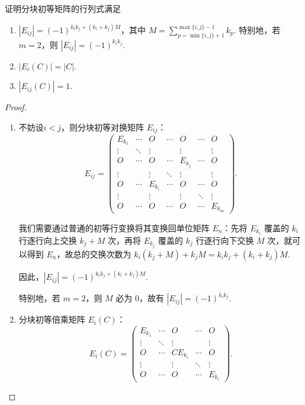\begin{example}{}{}
    证明分块初等矩阵的行列式满足

    \begin{enumerate}
        \item $|E_{ij}| = (-1)^{k_i k_j + (k_i + k_j) M}$，其中 $M=\displaystyle\sum_{p=\min\{i,j\} + 1}^{\max\{i,j\} - 1} k_p$. 特别地，若 $m=2$，则 $|E_{ij}| = (-1)^{k_i k_j}$.
        \item $|E_i(C)| = |C|$.
        \item $|E_{ij}(C)| = 1$.
    \end{enumerate}
\end{example}

\begin{proof}
    \begin{enumerate}
        \item 不妨设$i<j$，则分块初等对换矩阵 $E_{ij}$：
            \[
                E_{ij} = \begin{pmatrix}
                    E_{k_1} & \cdots & O       & \cdots & O       & \cdots & O       \\
                    \vdots  & \ddots & \vdots  &        & \vdots  &        & \vdots  \\
                    O       & \cdots & O       & \cdots & E_{k_j} & \cdots & O       \\
                    \vdots  &        & \vdots  & \ddots & \vdots  &        & \vdots  \\
                    O       & \cdots & E_{k_i} & \cdots & O       & \cdots & O       \\
                    \vdots  &        & \vdots  &        & \vdots  & \ddots & \vdots  \\
                    O       & \cdots & O       & \cdots & O       & \cdots & E_{k_m}
                \end{pmatrix}.
            \]

            我们需要通过普通的初等行变换将其变换回单位矩阵 $E_n$：先将 $E_{k_i}$ 覆盖的 $k_i$ 行逐行向上交换 $k_j + M$ 次，再将 $E_{k_j}$ 覆盖的 $k_j$ 行逐行向下交换 $M$ 次，就可以得到 $E_n$，故总的交换次数为 $k_i(k_j+M) + k_j M = k_i k_j + (k_i + k_j) M$.

            因此，$|E_{ij}| = (-1)^{k_i k_j + (k_i + k_j) M}$.

            特别地，若 $m=2$，则 $M$ 必为 $0$，故有 $|E_{ij}| = (-1)^{k_i k_j}$.

        \item 分块初等倍乘矩阵 $E_i(C)$：
            \[
                E_i(C) = \begin{pmatrix}
                    E_{k_1} & \cdots & O        & \cdots & O       \\
                    \vdots  & \ddots & \vdots   &        & \vdots  \\
                    O       & \cdots & CE_{k_i} & \cdots & O       \\
                    \vdots  &        & \vdots   & \ddots & \vdots  \\
                    O       & \cdots & O        & \cdots & E_{k_i}
                \end{pmatrix}.
            \]


\end{enumerate}
\end{proof}
